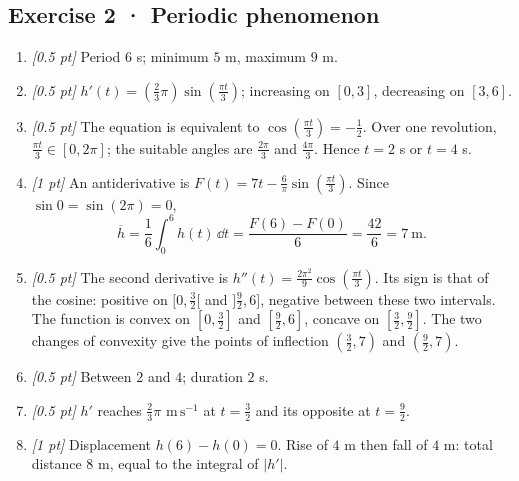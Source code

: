\subsection*{Exercise 2 · Periodic phenomenon}\begin{enumerate}

\item \textit{[0.5 pt]} Period $6$ s; minimum $5$ m, maximum $9$ m.

\item \textit{[0.5 pt]} $h'(t)=(\frac{2}{3}\pi)\sin (\frac{\pi t}{3})$; increasing on $[0,3]$, decreasing on $[3,6]$.

\item \textit{[0.5 pt]} The equation is equivalent to $\cos (\frac{\pi t}{3})=-\frac{1}{2}$. Over one revolution, $\frac{\pi t}{3}\in[0,2\pi]$; the suitable angles are $\frac{2\pi}{3}$ and $\frac{4\pi}{3}$. Hence $t=2$ s or $t=4$ s.

\item \textit{[1 pt]} An antiderivative is $F(t)=7t-\frac{6}{\pi}\sin (\frac{\pi t}{3})$. Since $\sin0=\sin(2\pi)=0$,
\[\overline h=\frac{1}{6}\int_0^{6}h(t)\,\dd t=\frac{F(6)-F(0)}{6}=\frac{42}{6}=7\ \mathrm{m}.\]

\item \textit{[0.5 pt]} The second derivative is $h''(t)=\frac{2\pi^2}{9}\cos (\frac{\pi t}{3})$. Its sign is that of the cosine: positive on $[0,\frac{3}{2}[$ and $]\frac{9}{2},6]$, negative between these two intervals. The function is convex on $[0,\frac{3}{2}]$ and $[\frac{9}{2},6]$, concave on $[\frac{3}{2},\frac{9}{2}]$. The two changes of convexity give the points of inflection $(\frac{3}{2},7)$ and $(\frac{9}{2},7)$.

\item \textit{[0.5 pt]} Between $2$ and $4$; duration $2$ s.

\item \textit{[0.5 pt]} $h'$ reaches $\frac{2}{3}\pi$ $\mathrm{m\,s^{-1}}$ at $t=\frac{3}{2}$ and its opposite at $t=\frac{9}{2}$.

\item \textit{[1 pt]} Displacement $h(6)-h(0)=0$. Rise of $4$ m then fall of $4$ m: total distance $8$ m, equal to the integral of $|h'|$.

\end{enumerate}

